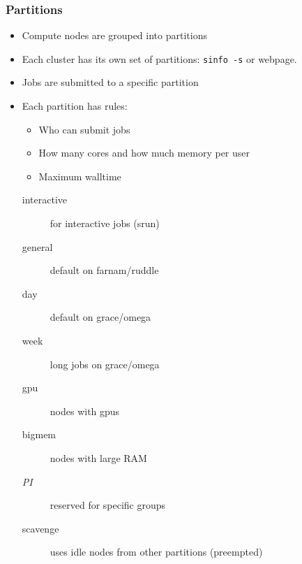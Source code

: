 \documentclass[10pt]{beamer}
\begin{document}
\begin{frame}[fragile]
\frametitle{Partitions}
\begin{itemize}
\item Compute nodes are grouped into partitions
\item Each cluster has its own set of partitions: \verb+sinfo -s+ or webpage.
\item Jobs are submitted to a specific partition
\item Each partition has rules:
\begin{itemize}
\item Who can submit jobs
\item How many cores and how much memory per user
\item Maximum walltime
\end{itemize}
\begin{description}
\item [interactive] for interactive jobs (srun)
\item [general] default on farnam/ruddle
\item [day] default on grace/omega
\item [week] long jobs on grace/omega
\item [gpu] nodes with gpus
\item [bigmem] nodes with large RAM
\item [\textit{PI}] reserved for specific groups
\item [scavenge] uses idle nodes from other partitions (preempted)
\end{description}
\end{itemize}

\end{frame}
\end{document}

